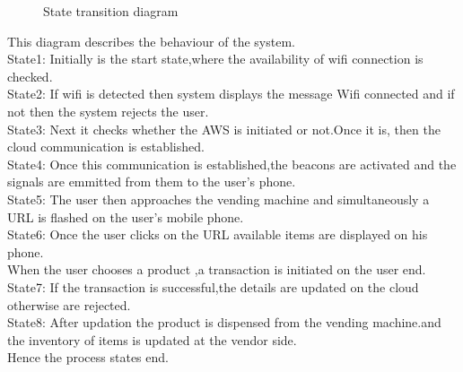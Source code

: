 \documentclass[oneside,a4paper,12pt]{report}
\begin{document}
\begin{center}
	\begin{figure}[!htbp]
		\centering
	  \caption{State transition diagram}
	  \label{fig:state-dig}
	\end{figure}
\end{center} 
\newpage
This diagram describes the behaviour of the system.\\
State1: Initially is the start state,where the availability of wifi connection is checked.\\
State2: If wifi is detected then system displays the message Wifi connected and if not then the system rejects the user.\\
State3: Next it checks whether the AWS is initiated or not.Once it is, then the cloud communication is established.\\
State4: Once this communication is established,the beacons are activated and the signals are emmitted from them to the user's phone.\\
State5: The user then approaches the vending machine and simultaneously a URL is flashed on the user's mobile phone.\\
State6: Once the user clicks on the URL available items are displayed on his phone.\\
When the user chooses a product ,a transaction is initiated on the user end.\\
State7: If the transaction is successful,the details are updated on the cloud otherwise are rejected.\\
State8: After updation the product is dispensed from the vending machine.and the inventory of items is updated at the vendor side.\\
Hence the process states end.
\end{document}
